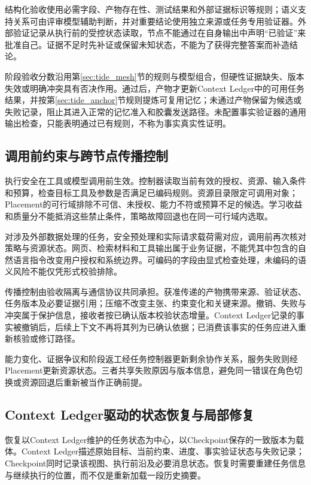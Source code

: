结构化验收使用必需字段、产物存在性、测试结果和外部证据标识等规则；语义支持关系可由评审模型辅助判断，并对重要结论使用独立来源或任务专用验证器。外部验证记录从执行前的受控状态读取，节点不能通过在自身输出中声明“已验证”来批准自己。证据不足时先补证或保留未知状态，不能为了获得完整答案而补造结论。

阶段验收分数沿用第\ref{sec:tide_mesh}节的规则与模型组合，但硬性证据缺失、版本失效或明确冲突具有否决作用。通过后，产物才更新Context Ledger中的可用任务结果，并按第\ref{sec:tide_anchor}节规则提炼可复用记忆；未通过产物保留为候选或失败记录，阻止其进入正常的记忆准入和胶囊发送路径。未配置事实验证器的通用输出检查，只能表明通过已有规则，不称为事实真实性证明。

\subsection{调用前约束与跨节点传播控制}

执行安全在工具或模型调用前生效。控制器读取当前有效的授权、资源、输入条件和预算，检查目标工具及参数是否满足已编码规则。资源目录限定可调用对象；Placement的可行域排除不可信、未授权、能力不符或预算不足的候选。学习收益和质量分不能抵消这些禁止条件，策略故障回退也在同一可行域内选取。

对涉及外部数据处理的任务，安全预处理和实际请求载荷需对应，调用前再次核对策略与资源状态。网页、检索材料和工具输出属于业务证据，不能凭其中包含的自然语言指令改变用户授权和系统边界。可编码的字段由显式检查处理，未编码的语义风险不能仅凭形式校验排除。

传播控制由验收隔离与通信协议共同承担。获准传递的产物携带来源、验证状态、任务版本及必要证据引用；压缩不改变主张、约束变化和关键来源。撤销、失败与冲突属于保护信息，接收者按已确认版本校验状态增量。Context Ledger记录的事实被撤销后，后续上下文不再将其列为已确认依据；已消费该事实的任务应进入重新核验或修订路径。

能力变化、证据争议和阶段返工经任务控制器更新剩余协作关系，服务失败则经Placement更新资源状态。三者共享失败原因与版本信息，避免同一错误在角色切换或资源回退后重新被当作正确前提。

\subsection{Context Ledger驱动的状态恢复与局部修复}

恢复以Context Ledger维护的任务状态为中心，以Checkpoint保存的一致版本为载体。Context Ledger描述原始目标、当前约束、进度、事实验证状态与失败记录；Checkpoint同时记录该视图、执行前沿及必要消息状态。恢复时需要重建任务信息与继续执行的位置，而不仅是重新加载一段历史摘要。


